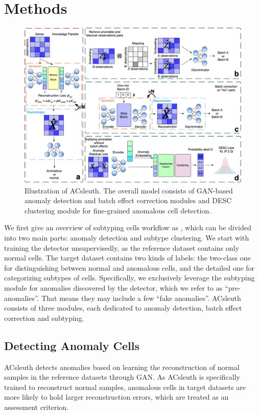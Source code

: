 \documentclass{article}
\begin{document}
\section{Methods}
\begin{figure}
    \centering
    \includegraphics[scale=0.20]{Framework.jpg}
    \caption{Illustration of ACsleuth. The overall model consists of GAN-based anomaly detection and batch effect correction modules and DESC clustering module for fine-grained anomalous cell detection.}
    \label{fig:workflow}
\end{figure}
We first give an overview of subtyping cells workflow as , which can be divided into two main 
parts: anomaly detection and subtype clustering. We start with training the detector 
unsupervisedly, as the reference dataset contains only normal cells. The target dataset 
contains two kinds of labels: the two-class one for distinguishing between normal and 
anomalous cells, and the detailed one for categorizing subtypes of cells. Specifically, 
we exclusively leverage the subtyping module for anomalies discovered by the detector, 
which we refer to as “pre-anomalies”. That means they may include a few “fake anomalies”. 
ACsleuth consists of three modules, each dedicated to anomaly detection, batch effect correction and subtyping.

\subsection{Detecting Anomaly Cells}
ACsleuth detects anomalies based on learning the reconstruction of normal samples in the reference datasets through GAN. 
As ACsleuth is specifically trained to reconstruct normal samples, 
anomalous cells in target datasets are more likely to hold larger reconstruction errors, 
which are treated as an assessment criterion. 
\end{document}
